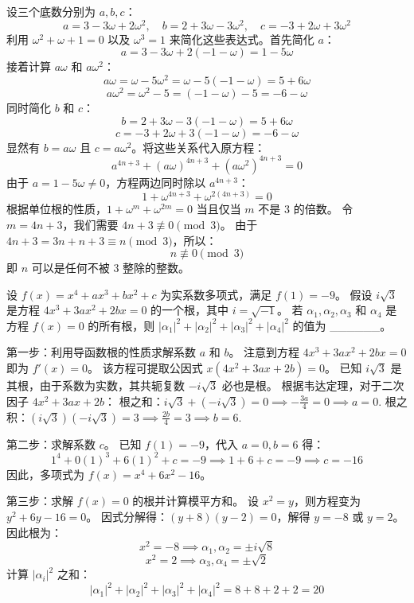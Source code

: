 \begin{questions}
\begin{solution}
设三个底数分别为 $a, b, c$：
\[
a = 3-3\omega+2\omega^2, \quad b = 2+3\omega-3\omega^2, \quad c = -3+2\omega+3\omega^2
\]
利用 $\omega^2+\omega+1=0$ 以及 $\omega^3=1$ 来简化这些表达式。首先简化 $a$：
\[
a = 3-3\omega+2(-1-\omega) = 1-5\omega
\]
接着计算 $a\omega$ 和 $a\omega^2$：
\[
a\omega = \omega-5\omega^2 = \omega-5(-1-\omega) = 5+6\omega
\]
\[
a\omega^2 = \omega^2-5 = (-1-\omega)-5 = -6-\omega
\]
同时简化 $b$ 和 $c$：
\[
b = 2+3\omega-3(-1-\omega) = 5+6\omega
\]
\[
c = -3+2\omega+3(-1-\omega) = -6-\omega
\]
显然有 $b = a\omega$ 且 $c = a\omega^2$。将这些关系代入原方程：
\[
a^{4n+3} + (a\omega)^{4n+3} + (a\omega^2)^{4n+3} = 0
\]
由于 $a = 1-5\omega \neq 0$，方程两边同时除以 $a^{4n+3}$：
\[
1 + \omega^{4n+3} + \omega^{2(4n+3)} = 0
\]
根据单位根的性质，$1+\omega^m+\omega^{2m}=0$ 当且仅当 $m$ 不是 $3$ 的倍数。
令 $m = 4n+3$，我们需要 $4n+3 \not\equiv 0 \pmod{3}$。
由于 $4n+3 = 3n + n + 3 \equiv n \pmod{3}$，所以：
\[
n \not\equiv 0 \pmod{3}
\]
即 $n$ 可以是任何不被 $3$ 整除的整数。
\end{solution}

    \question
设 $f(x) = x^4 + ax^3 + bx^2 + c$ 为实系数多项式，满足 $f(1) = -9$。
假设 $i\sqrt{3}$ 是方程 $4x^3 + 3ax^2 + 2bx = 0$ 的一个根，其中 $i = \sqrt{-1}$。
若 $\alpha_1, \alpha_2, \alpha_3$ 和 $\alpha_4$ 是方程 $f(x) = 0$ 的所有根，则 $|\alpha_1|^2 + |\alpha_2|^2 + |\alpha_3|^2 + |\alpha_4|^2$ 的值为 \_\_\_\_\_\_。

\begin{solution}
第一步：利用导函数根的性质求解系数 $a$ 和 $b$。
注意到方程 $4x^3 + 3ax^2 + 2bx = 0$ 即为 $f'(x) = 0$。
该方程可提取公因式 $x(4x^2 + 3ax + 2b) = 0$。
已知 $i\sqrt{3}$ 是其根，由于系数为实数，其共轭复数 $-i\sqrt{3}$ 必也是根。
根据韦达定理，对于二次因子 $4x^2 + 3ax + 2b$：
根之和：$i\sqrt{3} + (-i\sqrt{3}) = 0 \implies -\frac{3a}{4} = 0 \implies a = 0$.
根之积：$(i\sqrt{3})(-i\sqrt{3}) = 3 \implies \frac{2b}{4} = 3 \implies b = 6$.

第二步：求解系数 $c$。
已知 $f(1) = -9$，代入 $a=0, b=6$ 得：
\[
1^4 + 0(1)^3 + 6(1)^2 + c = -9 \implies 1 + 6 + c = -9 \implies c = -16
\]
因此，多项式为 $f(x) = x^4 + 6x^2 - 16$。

第三步：求解 $f(x)=0$ 的根并计算模平方和。
设 $x^2 = y$，则方程变为 $y^2 + 6y - 16 = 0$。
因式分解得：$(y+8)(y-2) = 0$，解得 $y = -8$ 或 $y = 2$。
因此根为：
\[
x^2 = -8 \implies \alpha_1, \alpha_2 = \pm i\sqrt{8}
\]
\[
x^2 = 2 \implies \alpha_3, \alpha_4 = \pm \sqrt{2}
\]
计算 $|\alpha_i|^2$ 之和：
\[
|\alpha_1|^2 + |\alpha_2|^2 + |\alpha_3|^2 + |\alpha_4|^2 = 8 + 8 + 2 + 2 = 20
\]
\end{solution}


\end{questions}
